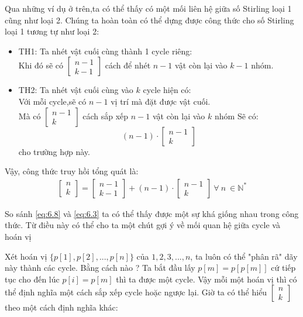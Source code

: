 Qua những ví dụ ở trên,ta có thể thấy có một mối liên hệ giữa số Stirling loại 1 cũng như loại 2. 
Chúng ta hoàn toàn có thể dựng được công thức cho số Stirling loại 1 tương tự như loại 2:
    \begin{itemize}
        \item TH1: Ta nhét vật cuối cùng thành 1 cycle riêng: \\ 
        Khi đó sẽ có $\begin{bmatrix} n - 1 \\ k - 1\end{bmatrix}$ cách để
        nhét $n - 1$ vật còn lại vào $k - 1$ nhóm.
        \item TH2: Ta nhét vật cuối cùng vào $k$ cycle hiện có: \\
        Với mỗi cycle,sẽ có $n-1$ vị trí mà đặt được vật cuối. \\
        Mà có $\begin{bmatrix} n - 1 \\ k \end{bmatrix}$ cách sắp xếp $n-1$ vật còn lại vào $k$ nhóm
        Sẽ có:
            $$(n - 1) \cdot \begin{bmatrix} n - 1 \\ k \end{bmatrix}$$ 
        cho trường hợp này.
    \end{itemize}
Vậy, công thức truy hồi tổng quát là: 
\begin{equation}
    \begin{aligned}
       \begin{bmatrix} n \\ k \end{bmatrix} 
       = 
       \begin{bmatrix} n - 1 \\ k - 1\end{bmatrix}
        + 
        (n - 1) \cdot \begin{bmatrix} n - 1 \\ k \end{bmatrix}
        \ \forall \ n \ \in \mathbb{N^{*}}
    \end{aligned} \label{eq:6.8}
\end{equation}

So sánh \eqref{eq:6.8} và \eqref{eq:6.3} ta có thể thấy được một sự khá giống nhau trong công thức. 
Từ điều này có thể cho ta một chút gợi ý về mối quan hệ giữa cycle và hoán vị 

Xét hoán vị $\{p[1],p[2],...,p[n]\}$ của ${1,2,3,...,n}$, ta luôn có thể "phân rã" dãy này thành các cycle.
Bằng cách nào ? 
Ta bắt đầu lấy $p[m] = p[p[m]]$ cứ tiếp tục cho đến lúc $p[i] = p[m]$  thì ta được một cycle.
Vậy mỗi một hoán vị thì có thể định nghĩa một cách sắp xếp cycle hoặc ngược lại. 
Giờ ta có thể hiểu $\begin{bmatrix} n \\ k \end{bmatrix}$ theo một cách định nghĩa khác:
 

